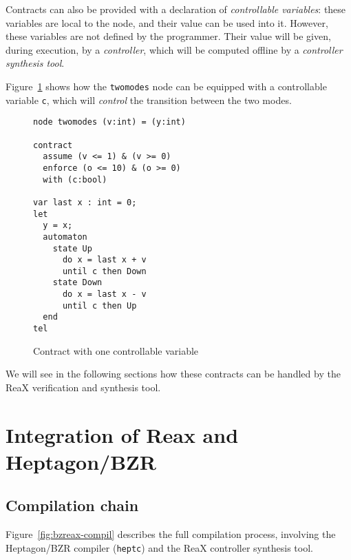 \documentclass[a4paper]{article}
\begin{document}
Contracts can also be provided with a declaration of
\emph{controllable variables}: these variables are local to the node,
and their value can be used into it. However, these variables are not
defined by the programmer. Their value will be given, during
execution, by a \emph{controller}, which will be computed offline by a
\emph{controller synthesis tool}.

Figure~\ref{fig:exple-contvar} shows how the \texttt{twomodes} node
can be equipped with a controllable variable \texttt{c}, which will
\emph{control} the transition between the two modes.

\begin{figure}[htbp]
  \centering
\begin{lstlisting}
node twomodes (v:int) = (y:int)

contract
  assume (v <= 1) & (v >= 0)
  enforce (o <= 10) & (o >= 0)
  with (c:bool)

var last x : int = 0;
let
  y = x;
  automaton
    state Up
      do x = last x + v
      until c then Down
    state Down
      do x = last x - v
      until c then Up
  end
tel
\end{lstlisting}
  \caption{Contract with one controllable variable}
  \label{fig:exple-contvar}
\end{figure}

We will see in the following sections how these contracts can be
handled by the ReaX verification and synthesis tool.

\section{Integration of Reax and Heptagon/BZR}

\subsection{Compilation chain}

Figure~\ref{fig:bzreax-compil} describes the full compilation process,
involving the Heptagon/BZR compiler (\texttt{heptc}) and the ReaX
controller synthesis tool.
\end{document}
